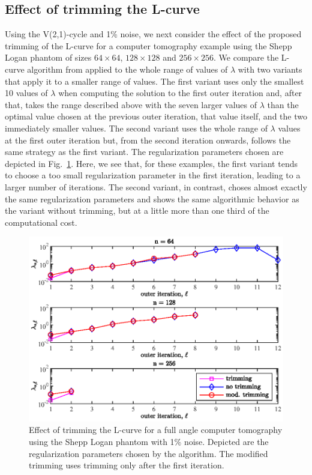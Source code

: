 \subsection{Effect of trimming the L-curve}
\label{ssec:trimming_numerical}
Using the V(2,1)-cycle and 1\% noise, we next consider the effect of the proposed trimming of the L-curve for a computer tomography example using the Shepp Logan phantom of sizes $64 \times 64$, $128 \times 128$ and $256 \times 256$. We compare the L-curve algorithm from \cite{OlearyHansen} applied to the whole range of values of $\lambda$ with two variants that apply it to a smaller range of values. The first variant uses only the smallest 10 values of $\lambda$ when computing the solution to the first outer iteration and, after that, takes the range described above with the seven larger values of $\lambda$ than the optimal value chosen at the previous outer iteration, that value itself, and the two immediately smaller values. The second variant uses the whole range of $\lambda$ values at the first outer iteration but, from the second iteration onwards, follows the same strategy as the first variant. The regularization parameters chosen are depicted in Fig.~\ref{fig:shepp_logan_reg_params_with_and_without_trimming}. Here, we see that, for these examples, the first variant tends to choose a too small regularization parameter in the first iteration, leading to a larger number of iterations. The second variant, in contrast, choses almost exactly the same regularization parameters and shows the same algorithmic behavior as the variant without trimming, but at a little more than one third of the computational cost.
\begin{figure}[htbp]
\begin{center}
\includegraphics{figures/shepp_logan_reg_params_with_and_without_trimming}
\caption{Effect of trimming the L-curve for a full angle computer tomography using the Shepp Logan phantom with 1\% noise. Depicted are the regularization parameters chosen by the algorithm. The modified trimming uses trimming only after the first iteration.}
\label{fig:shepp_logan_reg_params_with_and_without_trimming}
\end{center}
\end{figure}

